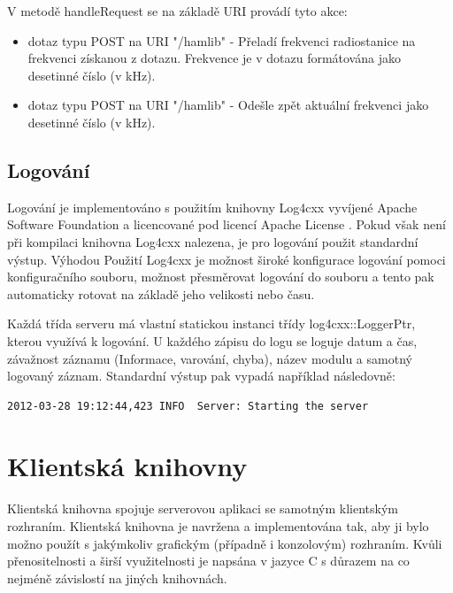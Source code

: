 V metodě handleRequest se na základě URI provádí tyto akce:

\begin{itemize}
\item dotaz typu POST na URI "/hamlib" - Přeladí frekvenci radiostanice %
na frekvenci získanou z dotazu. Frekvence
je v dotazu formátována jako desetinné číslo (v kHz).
\item dotaz typu POST na URI "/hamlib" - Odešle zpět aktuální frekvenci jako
desetinné číslo (v kHz).
\end{itemize}



\subsection{Logování}
\label{implementace_logovani}

Logování je implementováno s použitím knihovny Log4cxx vyvíjené Apache Software Foundation a licencované pod licencí
Apache License \cite{log4cxx}.  %
Pokud však není při kompilaci knihovna Log4cxx nalezena, je pro logování použit standardní výstup.
Výhodou Použití Log4cxx je možnost široké konfigurace logování pomoci konfiguračního souboru, možnost přesměrovat
logování do souboru a tento pak automaticky rotovat na základě jeho velikosti nebo času.

Každá třída serveru má vlastní statickou instanci třídy log4cxx::LoggerPtr, kterou využívá k logování.
U každého zápisu do logu se loguje datum a čas, závažnost záznamu (Informace, varování, chyba), název modulu a samotný
logovaný záznam. Standardní výstup pak vypadá například následovně:

\begin{verbatim}
2012-03-28 19:12:44,423 INFO  Server: Starting the server
\end{verbatim}

\section{Klientská knihovny}
\label{implementace_knihovna}

Klientská knihovna spojuje serverovou aplikaci se samotným klientským rozhraním.
Klientská knihovna je navržena a implementována
tak, aby ji bylo možno použít s jakýmkoliv grafickým (případně i konzolovým) rozhraním. Kvůli přenositelnosti a
širší využitelnosti je napsána v jazyce C s důrazem na co nejméně závislostí na jiných knihovnách.

